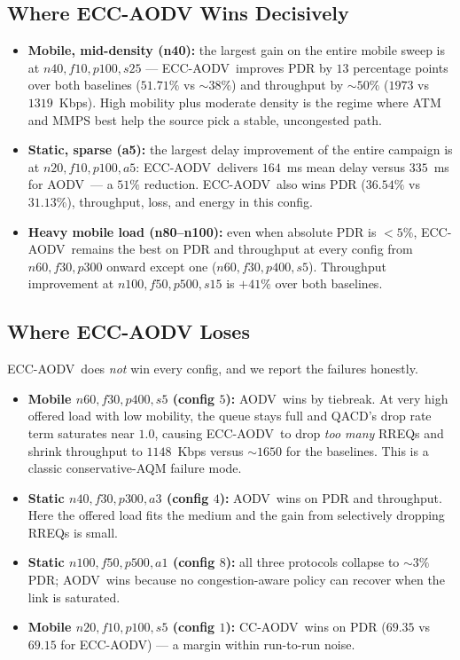 \documentclass[11pt,a4paper]{article}
\newcommand{\ecc}{ECC-AODV}
\newcommand{\cca}{CC-AODV}
\newcommand{\aodv}{AODV}
\begin{document}
\subsection{Where ECC-AODV Wins Decisively}

\begin{itemize}
    \item \textbf{Mobile, mid-density (n40):} the largest gain on the entire
          mobile sweep is at $n40,f10,p100,s25$ — \ecc\ improves PDR by
          $13$ percentage points over both baselines ($51.71\%$ vs $\sim
          38\%$) and throughput by $\sim 50\%$ ($1973$ vs $1319$~Kbps). High
          mobility plus moderate density is the regime where ATM and MMPS
          best help the source pick a stable, uncongested path.
    \item \textbf{Static, sparse (a5):} the largest delay improvement of the
          entire campaign is at $n20,f10,p100,a5$: \ecc\ delivers
          $164$~ms mean delay versus $335$~ms for \aodv\ — a $51\%$
          reduction. \ecc\ also wins PDR ($36.54\%$ vs $31.13\%$),
          throughput, loss, and energy in this config.
    \item \textbf{Heavy mobile load (n80--n100):} even when absolute PDR is
          $<5\%$, \ecc\ remains the best on PDR and throughput at every config
          from $n60,f30,p300$ onward except one ($n60,f30,p400,s5$). Throughput
          improvement at $n100,f50,p500,s15$ is $+41\%$ over both baselines.
\end{itemize}

\subsection{Where ECC-AODV Loses}

\ecc\ does \emph{not} win every config, and we report the failures honestly.

\begin{itemize}
    \item \textbf{Mobile $n60,f30,p400,s5$ (config $5$):} \aodv\ wins by tiebreak.
          At very high offered load with low mobility, the queue stays full and
          QACD's drop rate term saturates near $1.0$, causing \ecc\ to drop
          \emph{too many} RREQs and shrink throughput to $1148$~Kbps versus
          $\sim 1650$ for the baselines. This is a classic conservative-AQM
          failure mode.
    \item \textbf{Static $n40,f30,p300,a3$ (config $4$):} \aodv\ wins on PDR
          and throughput. Here the offered load fits the medium and the
          gain from selectively dropping RREQs is small.
    \item \textbf{Static $n100,f50,p500,a1$ (config $8$):} all three protocols
          collapse to $\sim 3\%$ PDR; \aodv\ wins because no congestion-aware
          policy can recover when the link is saturated.
    \item \textbf{Mobile $n20,f10,p100,s5$ (config $1$):} \cca\ wins on PDR
          ($69.35$ vs $69.15$ for \ecc) — a margin within run-to-run noise.
\end{itemize}
\end{document}
